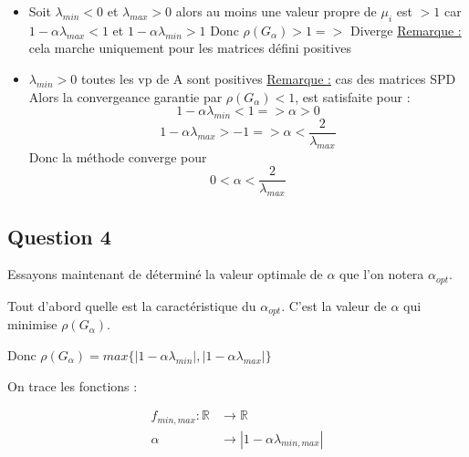 \documentclass[11pt]{article}
\begin{document}
\begin{itemize}
\item Soit $\lambda_{min} < 0$ et $\lambda_{max} > 0$\newline
  alors au moins une valeur propre de $\mu_i$ est $> 1$\newline
  car $1 - \alpha \lambda_{max} < 1$ et $1 - \alpha \lambda_{min} > 1$\newline
  Donc $\rho(G_{\alpha}) > 1 =>$ Diverge \newline
  \underline{Remarque :} cela marche uniquement pour les matrices
  défini positives
\item $\lambda_{min} > 0$ toutes les vp de A sont positives\newline
  \underline{Remarque :} cas des matrices SPD\newline
  Alors la convergeance garantie par $\rho(G_{\alpha}) < 1$, est
  satisfaite pour :
  $$ 1 - \alpha \lambda_{min} < 1 => \alpha > 0 $$
  $$ 1 - \alpha \lambda_{max} > -1 => \alpha <
  \frac{2}{\lambda_{max}} $$
  Donc la méthode converge pour
  $$ 0 < \alpha < \frac{2}{\lambda_{max}} $$
\end{itemize}

\subsection{Question 4}

Essayons maintenant de déterminé la valeur optimale de $\alpha$ que
l'on notera $\alpha_{opt}$.\newline

\vspace{5mm}

Tout d'abord quelle est la caractéristique du $\alpha_{opt}$. C'est la
valeur de $\alpha$ qui minimise $\rho(G_{\alpha})$.\newline

\vspace{5mm}

Donc $ \rho(G_{\alpha}) = max\{|1 - \alpha \lambda_{min}|, |1 - \alpha
\lambda_{max}|\} $\newline

\vspace{5mm}

On trace les fonctions :

\begin{equation*}
  \begin{split}
    f_{min, max} : \mathbb{R} & \rightarrow
    \mathbb{R}\\
    \alpha & \rightarrow | 1 - \alpha
    \lambda_{min, max} | \\
  \end{split}
\end{equation*}
\end{document}
